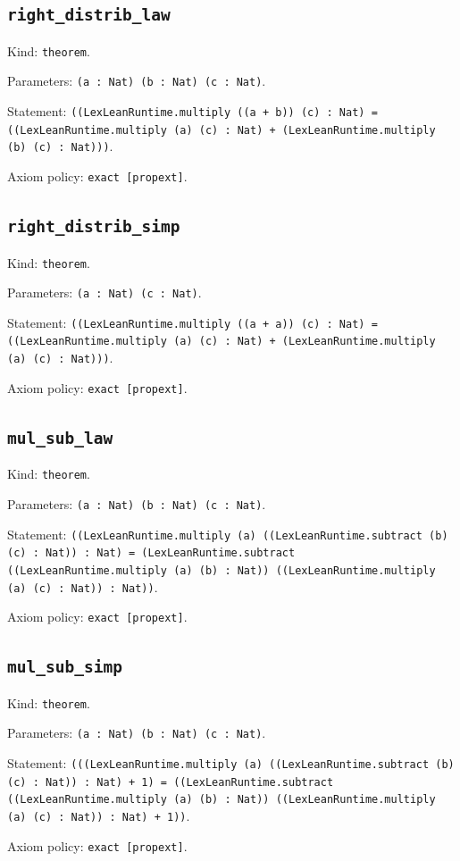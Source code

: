 \documentclass[11pt]{article}
\begin{document}
\subsection*{\texttt{right\_distrib\_law}}
\noindent Kind: \texttt{theorem}.\par
\noindent Parameters: \texttt{(a : Nat) (b : Nat) (c : Nat)}.\par
\noindent Statement: \texttt{((LexLeanRuntime.multiply ((a + b)) (c) : Nat) = ((LexLeanRuntime.multiply (a) (c) : Nat) + (LexLeanRuntime.multiply (b) (c) : Nat)))}.\par
\noindent Axiom policy: \texttt{exact [propext]}.\par
\subsection*{\texttt{right\_distrib\_simp}}
\noindent Kind: \texttt{theorem}.\par
\noindent Parameters: \texttt{(a : Nat) (c : Nat)}.\par
\noindent Statement: \texttt{((LexLeanRuntime.multiply ((a + a)) (c) : Nat) = ((LexLeanRuntime.multiply (a) (c) : Nat) + (LexLeanRuntime.multiply (a) (c) : Nat)))}.\par
\noindent Axiom policy: \texttt{exact [propext]}.\par
\subsection*{\texttt{mul\_sub\_law}}
\noindent Kind: \texttt{theorem}.\par
\noindent Parameters: \texttt{(a : Nat) (b : Nat) (c : Nat)}.\par
\noindent Statement: \texttt{((LexLeanRuntime.multiply (a) ((LexLeanRuntime.subtract (b) (c) : Nat)) : Nat) = (LexLeanRuntime.subtract ((LexLeanRuntime.multiply (a) (b) : Nat)) ((LexLeanRuntime.multiply (a) (c) : Nat)) : Nat))}.\par
\noindent Axiom policy: \texttt{exact [propext]}.\par
\subsection*{\texttt{mul\_sub\_simp}}
\noindent Kind: \texttt{theorem}.\par
\noindent Parameters: \texttt{(a : Nat) (b : Nat) (c : Nat)}.\par
\noindent Statement: \texttt{(((LexLeanRuntime.multiply (a) ((LexLeanRuntime.subtract (b) (c) : Nat)) : Nat) + 1) = ((LexLeanRuntime.subtract ((LexLeanRuntime.multiply (a) (b) : Nat)) ((LexLeanRuntime.multiply (a) (c) : Nat)) : Nat) + 1))}.\par
\noindent Axiom policy: \texttt{exact [propext]}.\par
\end{document}

